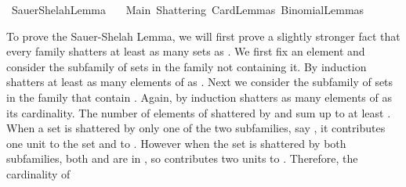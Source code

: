 %
\begin{isabellebody}%
%
%
\isadelimdocument
%
\endisadelimdocument
%
\isatagdocument
%
\isamarkuptrue%
%
\endisatagdocument
{\isafolddocument}%
%
\isadelimdocument
%
\endisadelimdocument
%
\isadelimtheory
%
\endisadelimtheory
%
\isatagtheory
{}\isamarkupfalse%
\ Sauer{\isacharunderscore}{\kern0pt}Shelah{\isacharunderscore}{\kern0pt}Lemma\isanewline
\ \ \ Main\ Shattering\ Card{\isacharunderscore}{\kern0pt}Lemmas\ Binomial{\isacharunderscore}{\kern0pt}Lemmas\isanewline
{}%
\endisatagtheory
{\isafoldtheory}%
%
\isadelimtheory
%
\endisadelimtheory
%
\isadelimdocument
%
\endisadelimdocument
%
\isatagdocument
%
\isamarkuptrue%
%
\endisatagdocument
{\isafolddocument}%
%
\isadelimdocument
%
\endisadelimdocument
%
\begin{isamarkuptext}%
To prove the Sauer-Shelah Lemma, we will first prove a slightly stronger fact that every family
       shatters at least as many sets as . We first fix an element 
      and consider the subfamily  of sets in the family not containing it. By induction  
      shatters at least as many elements of  as . 
      Next we consider the subfamily  of sets in the family that contain .
      Again, by induction  shatters as many elements of  as its cardinality. 
      The number of elements of  shattered by  and  sum up to at least 
      . When a set  is shattered by only one of the two subfamilies, say , 
      it contributes one unit to the set  and to . However when the set is shattered by 
      both subfamilies, both  and  are in , so  contributes two units
      to . Therefore, the cardinality of  

\end{isamarkuptext}
\end{isabellebody}

